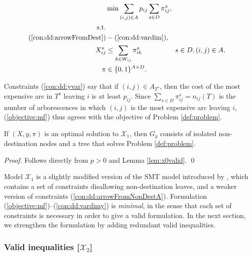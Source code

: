 \begin{subequations}[resume]\label{eq:smt-x2}
\begin{align}
\label{objective:mf} \makebox[0pt][l]{$\displaystyle{} \min \sum\limits_{(i,j) \in A} p_{ij} \sum\limits_{s \in D} \pi^s_{ij}, $}\\
\notag\text{s.t.}\\
\notag(\ref{con:dd:arrowFromDest}) &- (\ref{con:dd:vardim}),\\
\label{con:dd:yvar} X^s_{ij} & \leq \sum_{k\in W_{ij}}\pi^s_{ik} & s\in D, (i,j)\in A,\\
\label{con:dd:vardimy} \pi & \in \{0,1\}^{A\times D}.
\end{align}~
\end{subequations}

Constraints (\ref{con:dd:yvar}) say that if $(i,j)\in A_{T^s}$, then the cost of the most expensive arc in $T^s$ leaving $i$ is at least $p_{ij}$.
Since $\sum_{s\in D}\pi_{ij}^s=n_{ij}(T)$ is the number of arborescences in which $(i,j)$ is the most expensive arc leaving $i$,
(\ref{objective:mf}) thus agrees with the objective of Problem \ref{def:problem}.

\begin{prop}
\label{prop:x1valid}
If $(X,y,\pi)$ is an optimal solution to $\mathcal{X}_1$, then $G_y$ consists of isolated non-destination nodes and a tree that
solves Problem \ref{def:problem}.
\end{prop}
\begin{proof}
Follows directly from $p>0$ and Lemma \ref{lem:x0valid}.
\qed
\end{proof}

Model $\mathcal{X}_1$ is a slightly modified version of the SMT model introduced by \citet{ivanova16isco},
which contains a set of constraints disallowing non-destination leaves, and a weaker version of constraints (\ref{con:dd:arrowFromNonDestA}).
Formulation (\ref{objective:mf})--(\ref{con:dd:vardimy}) is \emph{minimal},
in the sense that each set of constraints is necessary in order to give a valid formulation.
In the next section, we strengthen the formulation by adding redundant valid inequalities.

\subsubsection{Valid inequalities [$\mathcal{X}_2$]} \label{sec:x2}

